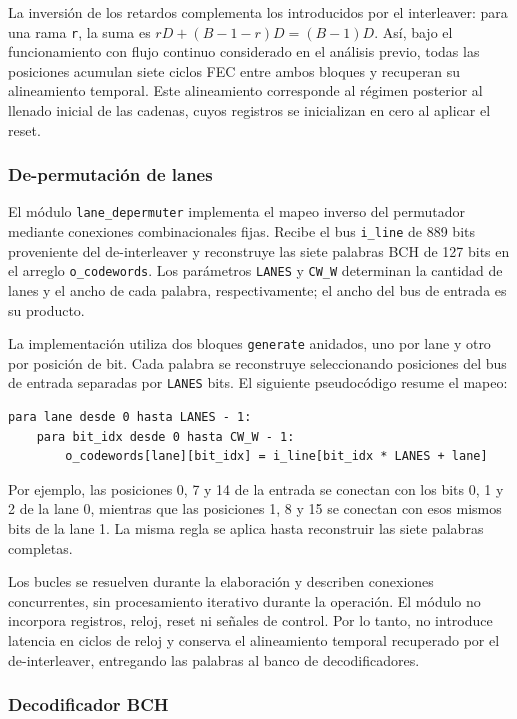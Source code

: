 \documentclass[10pt,a4paper]{article}
\begin{document}
La inversión de los retardos complementa los introducidos por el
interleaver: para una rama \texttt{r}, la suma es
$rD+(B-1-r)D=(B-1)D$. Así, bajo el funcionamiento con flujo continuo
considerado en el análisis previo, todas las posiciones acumulan
siete ciclos FEC entre ambos bloques y recuperan su alineamiento
temporal. Este alineamiento corresponde al régimen posterior al
llenado inicial de las cadenas, cuyos registros se inicializan en
cero al aplicar el reset.

\subsubsection{De-permutación de lanes}

El módulo \texttt{lane\_depermuter} implementa el mapeo inverso del
permutador mediante conexiones combinacionales fijas. Recibe el
bus \texttt{i\_line} de 889 bits proveniente del de-interleaver y
reconstruye las siete palabras BCH de 127 bits en el arreglo
\texttt{o\_codewords}. Los parámetros \texttt{LANES} y
\texttt{CW\_W} determinan la cantidad de lanes y el ancho de cada
palabra, respectivamente; el ancho del bus de entrada es su producto.

La implementación utiliza dos bloques \texttt{generate} anidados,
uno por lane y otro por posición de bit. Cada palabra se reconstruye
seleccionando posiciones del bus de entrada separadas por
\texttt{LANES} bits. El siguiente pseudocódigo resume el mapeo:

\begin{lstlisting}[basicstyle=\ttfamily\small]
para lane desde 0 hasta LANES - 1:
    para bit_idx desde 0 hasta CW_W - 1:
        o_codewords[lane][bit_idx] = i_line[bit_idx * LANES + lane]
\end{lstlisting}

Por ejemplo, las posiciones 0, 7 y 14 de la entrada se conectan
con los bits 0, 1 y 2 de la lane 0, mientras que las posiciones
1, 8 y 15 se conectan con esos mismos bits de la lane 1. La misma
regla se aplica hasta reconstruir las siete palabras completas.

Los bucles se resuelven durante la elaboración y describen
conexiones concurrentes, sin procesamiento iterativo durante la
operación. El módulo no incorpora registros, reloj, reset ni
señales de control. Por lo tanto, no introduce latencia en ciclos
de reloj y conserva el alineamiento temporal recuperado por el
de-interleaver, entregando las palabras al banco de decodificadores.

\subsubsection{Decodificador BCH}
\end{document}
